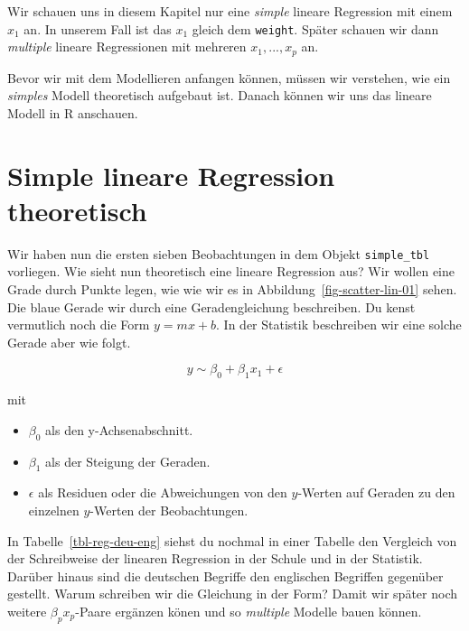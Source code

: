 \documentclass[
  letterpaper,
]{scrbook}
\providecommand{\tightlist}{%
  \setlength{\itemsep}{0pt}\setlength{\parskip}{0pt}}\usepackage{longtable,booktabs,array}
\begin{document}
Wir schauen uns in diesem Kapitel nur eine \emph{simple} lineare
Regression mit einem \(x_1\) an. In unserem Fall ist das \(x_1\) gleich
dem \texttt{weight}. Später schauen wir dann \emph{multiple} lineare
Regressionen mit mehreren \(x_1,..., x_p\) an.

Bevor wir mit dem Modellieren anfangen können, müssen wir verstehen, wie
ein \emph{simples} Modell theoretisch aufgebaut ist. Danach können wir
uns das lineare Modell in R anschauen.

\hypertarget{simple-lineare-regression-theoretisch}{%
\section{Simple lineare Regression
theoretisch}\label{simple-lineare-regression-theoretisch}}

Wir haben nun die ersten sieben Beobachtungen in dem Objekt
\texttt{simple\_tbl} vorliegen. Wie sieht nun theoretisch eine lineare
Regression aus? Wir wollen eine Grade durch Punkte legen, wie wie wir es
in Abbildung~\ref{fig-scatter-lin-01} sehen. Die blaue Gerade wir durch
eine Geradengleichung beschreiben. Du kenst vermutlich noch die Form
\(y = mx + b\). In der Statistik beschreiben wir eine solche Gerade aber
wie folgt.

\[
y \sim \beta_0 + \beta_1 x_1 + \epsilon
\]

mit

\begin{itemize}
\tightlist
\item
  \(\beta_0\) als den y-Achsenabschnitt.
\item
  \(\beta_1\) als der Steigung der Geraden.
\item
  \(\epsilon\) als Residuen oder die Abweichungen von den \(y\)-Werten
  auf Geraden zu den einzelnen \(y\)-Werten der Beobachtungen.
\end{itemize}

In Tabelle~\ref{tbl-reg-deu-eng} siehst du nochmal in einer Tabelle den
Vergleich von der Schreibweise der linearen Regression in der Schule und
in der Statistik. Darüber hinaus sind die deutschen Begriffe den
englischen Begriffen gegenüber gestellt. Warum schreiben wir die
Gleichung in der Form? Damit wir später noch weitere
\(\beta_px_p\)-Paare ergänzen könen und so \emph{multiple} Modelle bauen
können.
\end{document}
